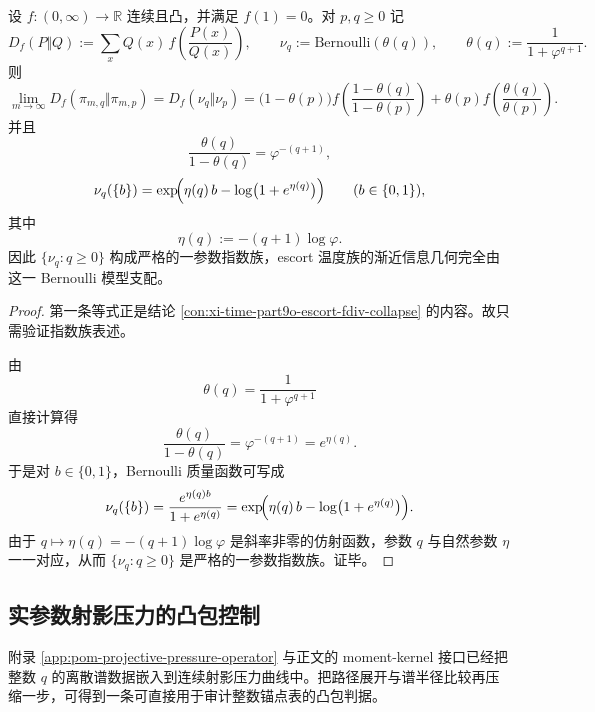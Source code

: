 \begin{theorem}\label{thm:derived-binfold-escort-fdiv-bernoulli-exponential-family}
设 \(f:(0,\infty)\to \mathbb R\) 连续且凸，并满足 \(f(1)=0\)。对 \(p,q\ge 0\) 记
\[
D_f(P\Vert Q):=\sum_x Q(x)\,f\!\left(\frac{P(x)}{Q(x)}\right),
\qquad
\nu_q:=\mathrm{Bernoulli}(\theta(q)),
\qquad
\theta(q):=\frac{1}{1+\varphi^{q+1}}.
\]
则
\[
\lim_{m\to\infty}D_f(\pi_{m,q}\Vert \pi_{m,p})
=
D_f(\nu_q\Vert \nu_p)
=
\bigl(1-\theta(p)\bigr)
f\!\left(\frac{1-\theta(q)}{1-\theta(p)}\right)
+\theta(p)
f\!\left(\frac{\theta(q)}{\theta(p)}\right).
\]
并且
\[
\frac{\theta(q)}{1-\theta(q)}=\varphi^{-(q+1)},
\]
\[
\nu_q(\{b\})
=
\exp\!\Bigl(\eta(q)\,b-\log\bigl(1+e^{\eta(q)}\bigr)\Bigr)
\qquad (b\in\{0,1\}),
\]
其中
\[
\eta(q):=-(q+1)\log\varphi.
\]
因此 \(\{\nu_q:q\ge 0\}\) 构成严格的一参数指数族，escort 温度族的渐近信息几何完全由这一 Bernoulli 模型支配。
\end{theorem}
\begin{proof}
第一条等式正是结论 \ref{con:xi-time-part9o-escort-fdiv-collapse} 的内容。故只需验证指数族表述。

由
\[
\theta(q)=\frac{1}{1+\varphi^{q+1}}
\]
直接计算得
\[
\frac{\theta(q)}{1-\theta(q)}=\varphi^{-(q+1)}=e^{\eta(q)}.
\]
于是对 \(b\in\{0,1\}\)，Bernoulli 质量函数可写成
\[
\nu_q(\{b\})
=
\frac{e^{\eta(q)b}}{1+e^{\eta(q)}}
=
\exp\!\Bigl(\eta(q)\,b-\log\bigl(1+e^{\eta(q)}\bigr)\Bigr).
\]
由于 \(q\mapsto \eta(q)=-(q+1)\log\varphi\) 是斜率非零的仿射函数，参数 \(q\) 与自然参数 \(\eta\) 一一对应，从而 \(\{\nu_q:q\ge 0\}\) 是严格的一参数指数族。证毕。
\end{proof}

\subsection{实参数射影压力的凸包控制}

附录 \ref{app:pom-projective-pressure-operator} 与正文的 moment-kernel 接口已经把整数 \(q\) 的离散谱数据嵌入到连续射影压力曲线中。把路径展开与谱半径比较再压缩一步，可得到一条可直接用于审计整数锚点表的凸包判据。

